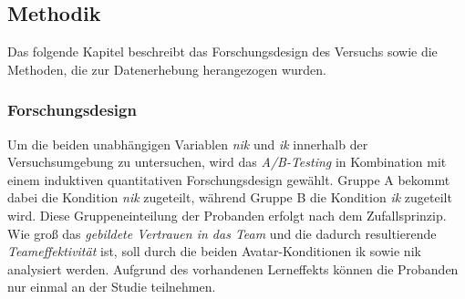 \documentclass[a4paper,11pt]{article}%
\renewcommand{\\}{\vspace*{0.5\baselineskip} \newline}
\begin{document}
\subsection{Methodik}	
Das folgende Kapitel beschreibt das Forschungsdesign des Versuchs sowie die Methoden, die zur Datenerhebung herangezogen wurden.
\subsubsection{Forschungsdesign}

Um die beiden unabhängigen Variablen \textit{\ac{nik}} und \textit{\ac{ik}} innerhalb der Versuchsumgebung zu untersuchen, wird das \textit{A/B-Testing} in Kombination mit einem induktiven quantitativen Forschungsdesign gewählt.
Gruppe A bekommt dabei die Kondition \newline \textit{\ac{nik}} zugeteilt, während Gruppe B die Kondition \textit{\ac{ik}} zugeteilt wird. Diese Gruppeneinteilung der Probanden erfolgt nach dem Zufallsprinzip. 
Wie groß das \textit{gebildete Vertrauen in das Team} und die dadurch resultierende \textit{Teameffektivität} ist, soll durch die beiden Avatar-Konditionen \ac{ik} sowie \ac{nik} analysiert werden. Aufgrund des vorhandenen Lerneffekts können die Probanden nur einmal an der Studie teilnehmen.

\end{document}
